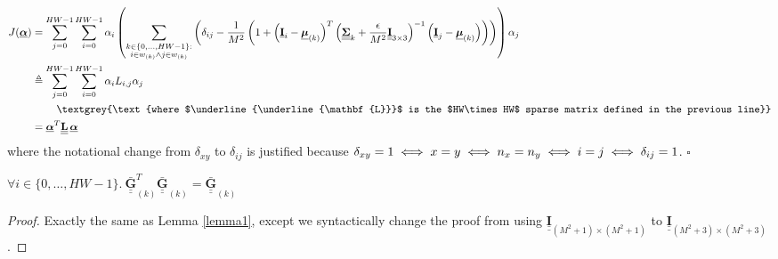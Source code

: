 \documentclass{article}
\def\vt#1{\underline{\mathbf{#1}}}
\def\vts#1{\underline{\boldsymbol{#1}}}
\def\mt#1{\underline{\underline{\mathbf{#1}}}}
\def\mts#1{\underline{\underline{\boldsymbol{#1}}}}
\begin{document}
\begin{align*}
    J(\vts\alpha) &= \sum_{j=0}^{HW-1} \sum_{i=0}^{HW-1} \alpha_i \left(\sum_{\substack{k\in\{0,\dots,HW-1\}:\\i\in w_{(k)}\wedge j\in w_{(k)}}} \left( \delta_{ij} - \frac1{M^2}\left(1 + \left(\vt{I}_{i} - \vts \mu_{(k)}\right)^T \left(\mts \Sigma_k + \frac\epsilon{M^2} \mt{I}_{3\times 3}\right)^{-1} \left(\vt{I}_{j} - \vts \mu_{(k)}\right) \right) \right)\right) \alpha_j\\
    &\triangleq \sum_{j=0}^{HW-1} \sum_{i=0}^{HW-1} \alpha_i L_{i,j} \alpha_j\\
    &\quad\quad\ \textgrey{\text{where $\mt L$ is the $HW\times HW$ sparse matrix defined in the previous line}}\\
    &= \vts \alpha^T \mt L\, \vts \alpha
\end{align*}
where the notational change from $\delta_{xy}$ to $\delta_{ij}$ is justified because $\delta_{xy} = 1 \iff x=y \iff n_x = n_y \iff i = j\\ \iff \delta_{ij}=1$. \hfill$\square$


\begin{lemma}\label{lemma3}
    $\forall i\in\{0,\dots,HW-1\}.\ \mt{\bar{G}}_{(k)}^T \mt{\bar{G}}_{(k)} = \mt{\bar{G}}_{(k)}$
    \begin{proof}
        Exactly the same as Lemma \ref{lemma1}, except we syntactically change the proof from using $\mt I_{(M^2+1)\times(M^2+1)}$ to $\mt I_{(M^2+3)\times(M^2+3)}$.
    \end{proof}
\end{lemma}
\end{document}
